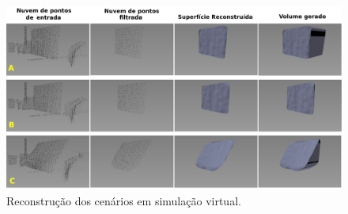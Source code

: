 \begin{figure}[H]
    \centering
    \includegraphics[scale=0.2]{dados/figuras/scenaries_reconstruction.png}
    \caption{Reconstrução dos cenários em simulação virtual.}
    \label{fig:recontrucao_virtual}
\end{figure}

